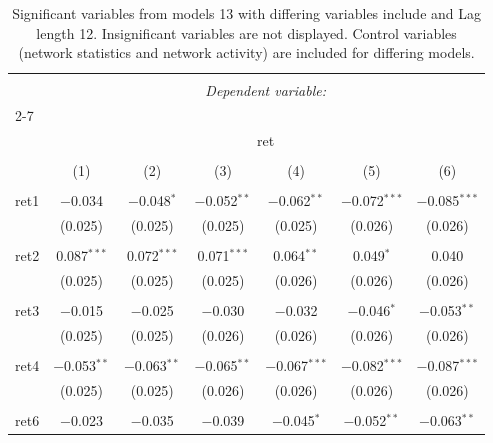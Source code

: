 
\begin{table}[!htbp] \centering 
  \caption{Significant variables from models 13 with differing variables include 
                               and Lag length 12. Insignificant variables are not displayed. 
                               Control variables (network statistics and network activity) are 
                               included for differing models.} 
  \label{Returnmodels1_5min_t} 
\scriptsize 
\begin{tabular}{@{\extracolsep{5pt}}lcccccc} 
\\[-1.8ex]\hline 
\hline \\[-1.8ex] 
 & \multicolumn{6}{c}{\textit{Dependent variable:}} \\ 
\cline{2-7} 
\\[-1.8ex] & \multicolumn{6}{c}{ret} \\ 
\\[-1.8ex] & (1) & (2) & (3) & (4) & (5) & (6)\\ 
\hline \\[-1.8ex] 
 ret1 & $-$0.034 & $-$0.048$^{*}$ & $-$0.052$^{**}$ & $-$0.062$^{**}$ & $-$0.072$^{***}$ & $-$0.085$^{***}$ \\ 
  & (0.025) & (0.025) & (0.025) & (0.025) & (0.026) & (0.026) \\ 
  & & & & & & \\ 
 ret2 & 0.087$^{***}$ & 0.072$^{***}$ & 0.071$^{***}$ & 0.064$^{**}$ & 0.049$^{*}$ & 0.040 \\ 
  & (0.025) & (0.025) & (0.025) & (0.026) & (0.026) & (0.026) \\ 
  & & & & & & \\ 
 ret3 & $-$0.015 & $-$0.025 & $-$0.030 & $-$0.032 & $-$0.046$^{*}$ & $-$0.053$^{**}$ \\ 
  & (0.025) & (0.025) & (0.026) & (0.026) & (0.026) & (0.026) \\ 
  & & & & & & \\ 
 ret4 & $-$0.053$^{**}$ & $-$0.063$^{**}$ & $-$0.065$^{**}$ & $-$0.067$^{***}$ & $-$0.082$^{***}$ & $-$0.087$^{***}$ \\ 
  & (0.025) & (0.025) & (0.026) & (0.026) & (0.026) & (0.026) \\ 
  & & & & & & \\ 
 ret6 & $-$0.023 & $-$0.035 & $-$0.039 & $-$0.045$^{*}$ & $-$0.052$^{**}$ & $-$0.063$^{**}$ \\ 

\end{tabular}
\end{table}
